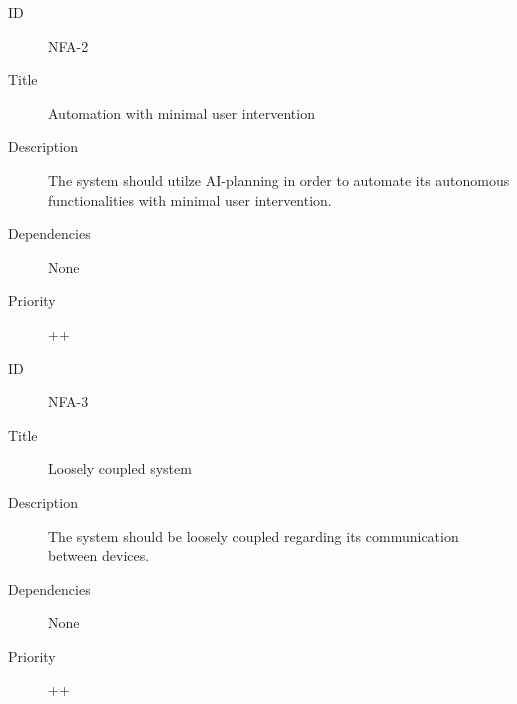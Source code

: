 \begin{description}
    \item[ID] NFA-2
    \item[Title] Automation with minimal user intervention
    \item[Description] The system should utilze AI-planning in order to automate its autonomous functionalities with minimal user intervention.
    \item[Dependencies] None
    \item[Priority] ++
\end{description}

\begin{description}
    \item[ID] NFA-3
    \item[Title] Loosely coupled system
    \item[Description] The system should be loosely coupled regarding its communication between devices.
    \item[Dependencies] None
    \item[Priority] ++
\end{description}
